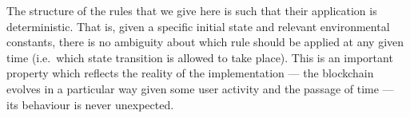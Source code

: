 The structure of the rules that we give here is such that their application is
deterministic. That is, given a specific initial state and relevant environmental
constants, there is no ambiguity
about which rule should be applied at any given time (i.e.~which state
transition is allowed to take place). This is an important property which reflects
the reality of the implementation --- the blockchain evolves in a particular way
given some user activity and the passage of time --- its behaviour is
never unexpected.

